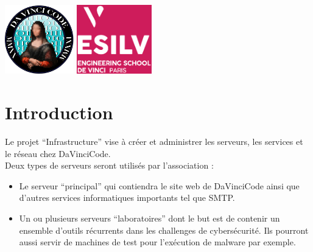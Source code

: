 \documentclass[12pt]{article}
\begin{document}
    \backgroundpages
    \setlength{\columnsep}{-1cm}
    \begin{multicols}{2}\raggedbottom\color{white}
        \noindent
        \parbox[t][40mm][t]{\columnwidth}{\setlength{\parindent}{1em}
        \vspace*{-18mm}
        \includegraphics[height=30mm]{davincicode}
        \includegraphics[height=30mm]{esilv}
        }

        \noindent
        \parbox[c][40mm][c]{\columnwidth}{\setlength{\parindent}{0em}
        \shadowoffsetx{1pt}
        \shadowoffsety{0pt}
        \vspace*{-24mm}
        \vspace{0.5cm}
        }

    \end{multicols}
    \vspace*{-30mm}
    \raggedbottom
    \section{Introduction}

    Le projet “Infrastructure” vise à créer et administrer les serveurs, les services et le réseau chez DaVinciCode.\\
Deux types de serveurs seront utilisés par l’association :

    \begin{itemize}
        \item{Le serveur “principal” qui contiendra le site web de DaVinciCode ainsi que d’autres services informatiques importants tel que SMTP. }
        \item{Un ou plusieurs serveurs “laboratoires” dont le but est de contenir un ensemble d’outils récurrents dans les challenges de cybersécurité. Ils pourront aussi servir de machines de test pour l’exécution de malware par exemple. }
    \end{itemize}
\end{document}
